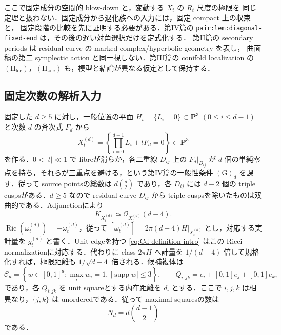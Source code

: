 \documentclass[a4paper,11pt]{ltjsarticle}
\numberwithin{equation}{section}
\theoremstyle{plain}
\theoremstyle{definition}
\theoremstyle{remark}
\newcommand{\PP}{\mathbf P}
\newcommand{\supp}{\operatorname{supp}}
\newcommand{\Ric}{\operatorname{Ric}}
\newcommand{\Cd}{\mathcal C_d}
\begin{document}
ここで固定成分の空間的 blow-down と，変動する $X_t$ の $R_t$ 尺度の極限を
同じ定理と扱わない．固定成分から退化族への入力には，固定 compact 上の収束と，
固定段階の比較を先に証明する必要がある．第IV篇の
\texttt{pair:lem:diagonal-fixed-end} は，その後の遅い対角選択だけを定式化する．
第II篇の secondary periods は residual curve の marked complex/hyperbolic geometry を表し，
曲面稿の第二 symplectic action と同一視しない．第III篇の conifold localization の
$\mathrm{(H_{loc})}$，$\mathrm{(H_{anc})}$ も，模型と結論が異なる仮定として保持する．

\subsection{固定次数の解析入力}
固定した $d\ge5$ に対し，一般位置の平面 $H_i=\{L_i=0\}\subset\PP^3$ $(0\le i\le d-1)$ と次数 $d$ の斉次式 $F_d$ から
\begin{equation}\label{eq:degree-d-family}
 X_t^{(d)}=\left\{\prod_{i=0}^{d-1}L_i+tF_d=0\right\}\subset\PP^3
\end{equation}
を作る．$0<|t|\ll1$ で fibreが滑らか，各二重線 $D_{ij}$ 上の $F_d|_{D_{ij}}$ が $d$ 個の単純零点を持ち，それらが三重点を避ける，という第IV篇の一般性条件 $\mathrm{(G)}_d$ を課す．従って source pointsの総数は $d\binom d2$ であり，各 $D_{ij}$ には $d-2$ 個の triple cuspsがある．$d\ge5$ なので residual curve $D_{ij}$ から triple cuspsを除いたものは双曲的である．Adjunctionにより
\[
 K_{X_t^{(d)}}\simeq\mathcal O_{X_t^{(d)}}(d-4).
\]
$\Ric(\omega_t^{(d)})=-\omega_t^{(d)}$，従って $[\omega_t^{(d)}]=2\pi(d-4)H|_{X_t^{(d)}}$ とし，対応する実計量を $g_t^{(d)}$ と書く．Unit edgeを持つ \eqref{eq:Cd-definition-intro} はこの Ricci normalizationに対応する．代わりに class $2\pi H$ へ計量を $1/(d-4)$ 倍して規格化すれば，極限距離も $1/\sqrt{d-4}$ 倍される．候補複体は
\begin{equation}\label{eq:Cd-definition-intro}
 \Cd=\left\{w\in[0,1]^d:\max_iw_i=1,\ |\supp w|\le3\right\},
 \qquad
 Q_{i;jk}=e_i+[0,1]e_j+[0,1]e_k,
\end{equation}
であり，各 $Q_{i;jk}$ を unit squareとする内在距離を $d_\square$ とする．ここで $i,j,k$ は相異なり，$\{j,k\}$ は unorderedである．従って maximal squaresの数は
\begin{equation}\label{eq:Nd-squares}
 N_d=d\binom{d-1}{2}
\end{equation}
である．
\end{document}
